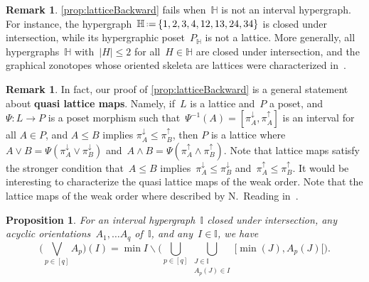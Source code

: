 \documentclass[reqno]{amsart}
\newtheorem{proposition}[theorem]{Proposition}
\theoremstyle{definition}
\newtheorem{remark}[theorem]{Remark}
\newcommand{\ssm}{\smallsetminus} %
\newcommand{\eqdef}{\mbox{\,\raisebox{0.2ex}{\scriptsize\ensuremath{\mathrm:}}\ensuremath{=}\,}} %
\newcommand{\defn}[1]{\textbf{\textsf{\color{PineGreen} #1}}} %
\newcommand{\meet}{\wedge} %
\newcommand{\join}{\vee} %
\newcommand{\bigJoin}{\bigvee} %
\newcommand{\projDown}{\pi^\downarrow} %
\newcommand{\projUp}{\pi^\uparrow} %
\newcommand{\HH}{\mathbb H}  %
\newcommand{\II}{\mathbb I} %
\begin{document}
\begin{remark}
\cref{prop:latticeBackward} fails when~$\HH$ is not an interval hypergraph.
For instance, the hypergraph~$\HH \eqdef \{ 1, 2, 3, 4, 12, 13, 24, 34 \}$ is closed under intersection, while its hypergraphic poset~$P_\HH$ is not a lattice.
More generally, all hypergraphs~$\HH$ with~$|H| \le 2$ for all~$H \in \HH$ are closed under intersection, and the graphical zonotopes whose oriented skeleta are lattices were characterized in~\cite{Pilaud-acyclicReorientationLattices}.
\end{remark}

\begin{remark}
In fact, our proof of \cref{prop:latticeBackward} is a general statement about \defn{quasi lattice maps}.
Namely, if~$L$ is a lattice and~$P$ a poset, and $\Psi : L \to P$ is a poset morphism such that~$\Psi^{-1}(A) = [\projDown_A, \projUp_A]$ is an interval  for all $A\in P$, and $A \le B$ implies $\projDown_A \le \projUp_B$, then $P$ is a lattice where~$A \join B =\Psi(\projDown_A \join \projDown_B)$ and~$A \meet B =\Psi(\projUp_A \meet \projUp_B)$.
Note that lattice maps satisfy the stronger condition that~$A \le B$ implies~$\projDown_A \le \projDown_B$ and~$\projUp_A \le \projUp_B$.
It would be interesting to characterize the quasi lattice maps of the weak order.
Note that the lattice maps of the weak order where described by N.~Reading in~\cite{Reading-latticeCongruences, Reading-arcDiagrams}.
\end{remark}

\begin{proposition}
\label{prop:joinLattice}
For an interval hypergraph~$\II$ closed under intersection, any acyclic orientations~$A_1, \dots A_q$ of~$\II$, and any~${I \in \II}$, we have
\[
\Big( \bigJoin_{p \in [q]} A_p \Big)(I) = \min I \ssm \Big( \bigcup_{p \in [q]} \bigcup_{\substack{J \in \II \\ A_p(J) \in I}} {[\min(J), A_p(J)[} \Big).
\]
\end{proposition}
\end{document}

